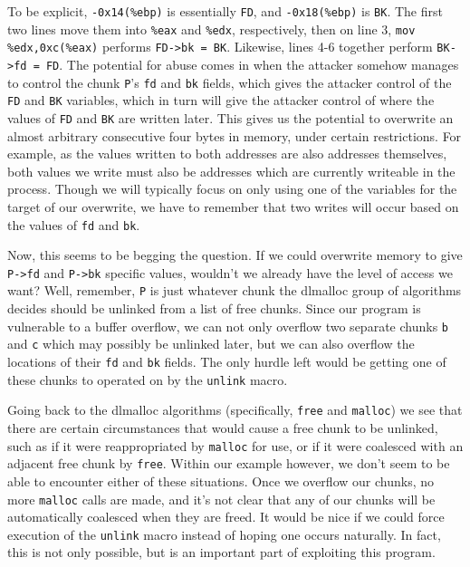 

To be explicit, \texttt{-0x14(\%ebp)} is essentially \texttt{FD}, and
\texttt{-0x18(\%ebp)} is \texttt{BK}. The first two lines move them into
\texttt{\%eax} and \texttt{\%edx}, respectively, then on line 3,
\texttt{mov \%edx,0xc(\%eax)} performs \texttt{FD->bk = BK}. Likewise,
lines 4-6 together perform \texttt{BK->fd = FD}. The potential for
abuse comes in when the attacker somehow manages to control
the chunk \texttt{P}'s \texttt{fd} and \texttt{bk} fields, which 
gives the attacker control of the \texttt{FD} and \texttt{BK} variables,
which in turn will give the attacker control of where the values
of \texttt{FD} and \texttt{BK} are written later. This gives us
the potential to overwrite an almost arbitrary consecutive four bytes
in memory, under certain restrictions. For example, as the values written
to both addresses are also addresses themselves, both values we
write must also be addresses which are currently writeable in the process.
Though we will typically focus on only using one of the variables
for the target of our overwrite, we have to remember that two
writes will occur based on the values of \texttt{fd} and \texttt{bk}.

Now, this seems to be begging the question. If we could overwrite memory
to give \texttt{P->fd} and \texttt{P->bk} specific values, wouldn't
we already have the level of access we want? Well, remember, \texttt{P}
is just whatever chunk the dlmalloc group of algorithms decides should
be unlinked from a list of free chunks. Since our program is vulnerable
to a buffer overflow, we can not only overflow two separate chunks
\texttt{b} and \texttt{c} which may possibly be unlinked later, but we can also
overflow the locations of their \texttt{fd} and \texttt{bk} fields. The
only hurdle left would be getting one of these chunks to operated
on by the \texttt{unlink} macro.

Going back to the dlmalloc algorithms (specifically, \texttt{free} and \texttt{malloc})
we see that there are certain circumstances that would cause a free chunk
to be unlinked, such as if it were reappropriated by \texttt{malloc} for
use, or if it were coalesced with an adjacent free chunk by \texttt{free}.
Within our example however, we don't seem to be able to encounter either
of these situations. Once we overflow our chunks, no more \texttt{malloc}
calls are made, and it's not clear that any of our chunks will be
automatically coalesced when they are freed. It would be nice if we could
force execution of the \texttt{unlink} macro instead of hoping one
occurs naturally. In fact, this is not only possible, but is an important
part of exploiting this program.

